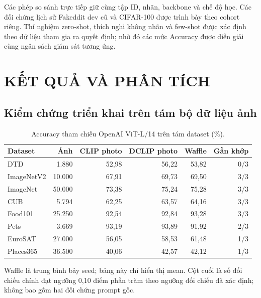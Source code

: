 \documentclass[12pt,a4paper]{article}
\newcommand{\BodySize}{13}
\newcommand{\BodyLeading}{15.6}
\newcommand{\BodyFont}{\fontsize{\BodySize}{\BodyLeading}\selectfont}
\newcommand{\Chapter}[1]{\clearpage\section{#1}}
\numberwithin{figure}{section}
\numberwithin{table}{section}
\numberwithin{equation}{section}
\begin{document}
Các phép so sánh trực tiếp giữ cùng tập ID, nhãn, backbone và chế độ học. Các đối chứng lịch sử Fakeddit dev cũ và CIFAR-100 được trình bày theo cohort riêng. Thí nghiệm zero-shot, thích nghi không nhãn và few-shot được xác định theo dữ liệu tham gia ra quyết định; nhờ đó các mức Accuracy được diễn giải cùng ngân sách giám sát tương ứng.
\clearpage




\Chapter{KẾT QUẢ VÀ PHÂN TÍCH}

\subsection{Kiểm chứng triển khai trên tám bộ dữ liệu ảnh}

\begin{table}[H]

\centering
\BodyFont
\caption{Accuracy tham chiếu OpenAI ViT-L/14 trên tám dataset (\%).}
\begin{tabularx}{\linewidth}{@{}L r r r r r@{}}
\toprule
Dataset & Ảnh & CLIP photo & DCLIP photo & Waffle & Gần khớp\\
\midrule
DTD & 1.880 & 52,98 & 56,22 & 53,82 & 0/3\\
ImageNetV2 & 10.000 & 67,91 & 69,73 & 69,50 & 3/3\\
ImageNet & 50.000 & 73,38 & 75,24 & 75,28 & 3/3\\
CUB & 5.794 & 62,25 & 63,57 & 64,16 & 3/3\\
Food101 & 25.250 & 92,54 & 92,84 & 93,28 & 3/3\\
Pets & 3.669 & 93,19 & 93,89 & 91,92 & 2/3\\
EuroSAT & 27.000 & 56,05 & 58,53 & 61,48 & 1/3\\
Places365 & 36.500 & 40,06 & 42,57 & 42,12 & 1/3\\
\bottomrule
\end{tabularx}
\par\medskip
\begin{minipage}{\linewidth}
    \BodyFont
Waffle là trung bình bảy seed; bảng này chỉ hiển thị mean. Cột cuối là số đối chiếu chính đạt ngưỡng
0,10 điểm phần trăm theo ngưỡng đối chiếu đã xác định; không bao gồm hai đối chứng prompt gốc.
\end{minipage}

\end{table}
\end{document}
